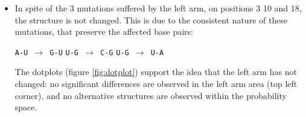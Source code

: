 \documentclass[10pt,a4paper]{article}
\begin{document}
\begin{itemize}

\item In spite of the 3 mutations suffered by the left arm, on positions 3 10 and 18, the structure is not changed. This is due to the consistent nature of these mutations, that preserve the affected base pairs:

\begin{center}

\texttt{A-U $\rightarrow$ G-U} \textbar
\texttt{U-G $\rightarrow$ C-G} \textbar
\texttt{U-G $\rightarrow$ U-A}

\end{center}

The dotplots (figure \ref{fig:dotplot}) support the idea that the left arm has not changed: no significant differences are observed in the left arm area (top left corner), and no alternative structures are observed within the probability space.



\end{itemize}
\end{document}
